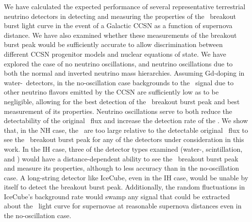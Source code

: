 We have calculated the expected performance of several representative
terrestrial neutrino detectors in detecting and measuring the
properties of the \nue\ breakout burst light curve in the event of a Galactic
CCSN as a function of supernova distance. We have also examined
whether these measurements of the breakout burst peak would be
sufficiently accurate to allow discrimination between different CCSN
progenitor models and nuclear equations of state.  We have explored the case
of no neutrino oscillations, and neutrino oscillations due to
both the normal and inverted neutrino mass hierarchies.  Assuming
Gd-doping in water-\cer\ detectors, in the no-oscillation case
 backgrounds to the \nue\ signal 
due to other neutrino flavors emitted by the CCSN
are sufficiently low as to be negligible, allowing for the best
detection of the \nue\ breakout burst peak and best measurement of its
properties. Neutrino oscillations serve to both reduce the
detectability of the original \nue\ flux and increase the
detection rate of the \background.  We show that, in the NH
case, the \backgrounds\ are too large relative to the detectable original
\nue\ flux to see the \nue\ breakout burst peak for any of the
detectors under consideration in this work.  In the IH case,
three of
the detector types examined (water-\cer, scintillation, and
) would have a distance-dependent ability to see the
\nue\ breakout burst peak and measure its properties, although to less
accuracy than in the no-oscillation case.  
A long-string detector like IceCube, even in the IH case, would be unable by itself to
    detect the breakout burst peak.  Additionally, the random fluctuations in
    IceCube's background rate would swamp any signal that could be extracted about the 
    \nue\ light curve for supernovae at reasonable supernova distances even in 
    the no-oscillation case.


